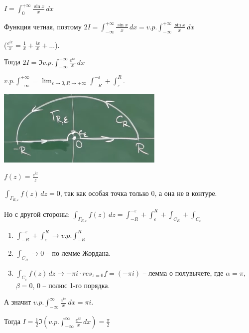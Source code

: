 \begin{example}
    $I = \int_{0}^{+\infty} \frac{\sin x}{x} \, dx$

    Функция четная, поэтому $2I = \int_{-\infty}^{+\infty} \frac{\sin x}{x} \, dx = v.p. \int_{-\infty}^{+\infty} \frac{\sin x}{x} \, dx$

    ($\frac{e^{ix}}{x} = \frac{1}{x} + \frac{ix}{x} + \ldots$).

    Тогда $2I = \Im v.p. \int_{-\infty}^{+\infty} \frac{e^{ix}}{x} \, dx$

    $v.p. \int_{-\infty}^{+\infty} = \lim_{\varepsilon \to 0, R \to +\infty} \int_{-R}^{-\varepsilon} + \int_{\varepsilon}^{R}$.

    \begin{center}
        \includegraphics[width=8cm]{assets/04-functions-of-complex-variables/example-principal-value-integral.png}
    \end{center}

    $f(z) = \frac{e^{iz}}{z}$

    $\int_{\Gamma_{R, \varepsilon}} f(z) \, dz = 0$, так как особая точка только $0$, а она не в контуре.

    Но с другой стороны: $\int_{\Gamma_{R, \varepsilon}} f(z) \, dz = \int_{-R}^{-\varepsilon} + \int_{\varepsilon}^{R} + \int_{C_R} + \int_{C_{\varepsilon}}$

    \begin{enumerate}
        \item {
            $\int_{-R}^{-\varepsilon} + \int_{\varepsilon}^{R} \rightarrow v.p. \int_{-R}^{R}$
        }
        \item {
            $\int_{C_R} \rightarrow 0$ -- по лемме Жордана.
        }
        \item {
            $\int_{C_{\varepsilon}} f(z) \, dz \rightarrow -\pi i \cdot res_{z = 0} f = (-\pi i)$ -- лемма о полувычете, где $\alpha=\pi$, $\beta=0$, $0$ -- полюс 1-го порядка.
        }
    \end{enumerate}


    А значит $v.p. \int_{-\infty}^{\infty} \frac{e^{ix}}{x} \, dx = \pi i$.

    Тогда $I = \frac{1}{2} \Im \left(v.p. \int_{-\infty}^{\infty} \frac{e^{ix}}{x} \, dx\right) = \frac{\pi}{2}$
\end{example}


